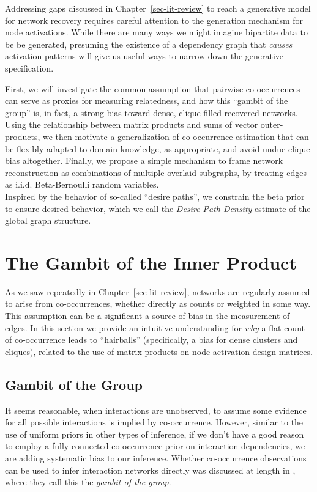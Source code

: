 \documentclass[%
	12pt,
		oneside,
		letterpaper
]{book}
\begin{document}
Addressing gaps discussed in Chapter~\ref{sec-lit-review} to reach a generative model for network recovery requires careful attention to the generation mechanism for node activations.
While there are many ways we might imagine bipartite data to be be generated, presuming the existence of a dependency graph that \emph{causes} activation patterns will give us useful ways to narrow down the generative specification.

First, we will investigate the common assumption that pairwise co-occurrences can serve as proxies for measuring relatedness, and how this ``gambit of the group'' is, in fact, a strong bias toward dense, clique-filled recovered networks.
Using the relationship between matrix products and sums of vector outer-products, we then motivate a generalization of co-occurrence estimation that can be flexibly adapted to domain knowledge, as appropriate, and avoid undue clique bias altogether.
Finally, we propose a simple mechanism to frame network reconstruction as combinations of multiple overlaid subgraphs, by treating edges as i.i.d. Beta-Bernoulli random variables.\\
Inspired by the behavior of so-called ``desire paths'', we constrain the beta prior to ensure desired behavior, which we call the \emph{Desire Path Density} estimate of the global graph structure.

\section{The Gambit of the Inner Product}\label{sec-clique-bias}

As we saw repeatedly in Chapter~\ref{sec-lit-review}, networks are regularly assumed to arise from co-occurrences, whether directly as counts or weighted in some way.
This assumption can be a significant a source of bias in the measurement of edges.
In this section we provide an intuitive understanding for \emph{why} a flat count of co-occurrence leads to ``hairballs'' (specifically, a bias for dense clusters and cliques), related to the use of matrix products on node activation design matrices.

\subsection{Gambit of the Group}\label{gambit-of-the-group}

It seems reasonable, when interactions are unobserved, to assume some evidence for all possible interactions is implied by co-occurrence.
However, similar to the use of uniform priors in other types of inference, if we don't have a good reason to employ a fully-connected co-occurrence prior on interaction dependencies, we are adding systematic bias to our inference.
Whether co-occurrence observations can be used to infer interaction networks directly was discussed at length in \textcite{Techniquesanalyzingvertebrate_Whitehead1999}, where they call this the \emph{gambit of the group}.
\end{document}
